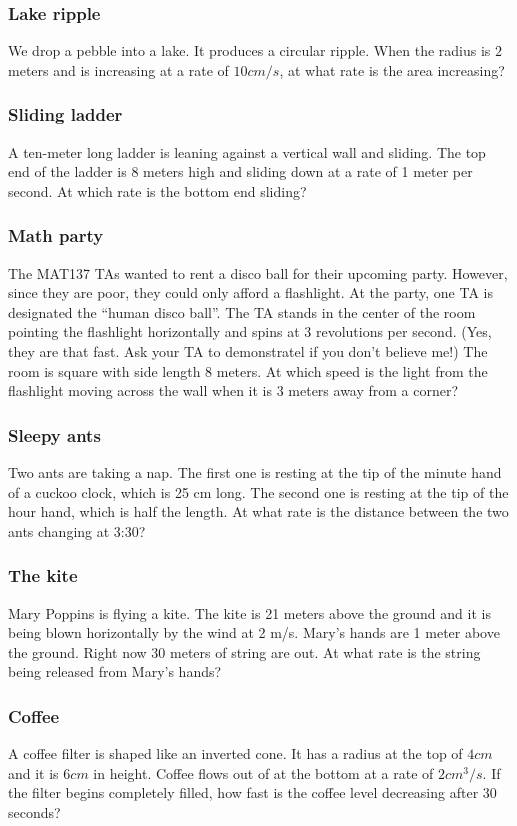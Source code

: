 \begin{frame}[t]
	\frametitle{Lake ripple}

	We drop a pebble into a lake. It produces a circular ripple. When the radius
	is $2$ meters and is increasing at a rate of $10cm/s$, at what rate is the area
	increasing?
\end{frame}

\begin{frame}[t]
	\frametitle{Sliding ladder}

	A ten-meter long ladder is leaning against a vertical wall and sliding. The top
	end of the ladder is 8 meters high and sliding down at a rate of 1 meter per second.
	At which rate is the bottom end sliding?
\end{frame}

\begin{frame}[t]
	\frametitle{Math party}

	The MAT137 TAs wanted to rent a disco ball for their upcoming party. However,
	since they are poor, they could only afford a flashlight. At the party, one TA
	is designated the ``human disco ball''. The TA stands in the center of the
	room pointing the flashlight horizontally and spins at 3 revolutions per
	second. (Yes, they are that fast. Ask your TA to demonstratel if you don't
	believe me!) The room is square with side length 8 meters. At which speed is the
	light from the flashlight moving across the wall when it is 3 meters away from
	a corner?
\end{frame}

\begin{frame}[t]
	\frametitle{Sleepy ants}

	Two ants are taking a nap. The first one is resting at the tip of the minute hand
	of a cuckoo clock, which is 25 cm long. The second one is resting at the tip of
	the hour hand, which is half the length. At what rate is the distance between the
	two ants changing at 3:30?
\end{frame}

\begin{frame}[t]
	\frametitle{The kite}

	Mary Poppins is flying a kite. The kite is 21 meters above the ground and it is
	being blown horizontally by the wind at 2 m/s. Mary's hands are 1 meter above
	the ground. Right now 30 meters of string are out. At what rate is the string
	being released from Mary's hands?
\end{frame}

\begin{frame}[t]
	\frametitle{Coffee}

	A coffee filter is shaped like an inverted cone. It has a radius at the top of
	$4cm$ and it is $6cm$ in height. Coffee flows out of at the bottom at a rate
	of $2cm^{3}/s$. If the filter begins completely filled, how fast is the coffee
	level decreasing after 30 seconds?
\end{frame}


